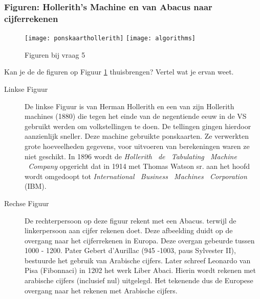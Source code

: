 \documentclass[../main.tex]{subfiles}
\begin{document}
\subsubsection{Figuren: Hollerith's Machine en van Abacus naar cijferrekenen}

\begin{figure}[ht!]
	\begin{center}
		\texttt{[image: ponskaarthollerith]}
		\texttt{[image: algorithms]}
	\end{center}
	\caption{Figuren bij vraag 5}
	\label{fig:vraag5}
\end{figure}

\begin{question}
Kan je de de figuren op Figuur \ref{fig:vraag5} thuisbrengen? Vertel wat je ervan weet.
\end{question}
\begin{description}
	\item[Linkse Figuur] De linkse Figuur is van Herman Hollerith en een van zijn Hollerith machines (1880) die tegen het einde van de negentiende eeuw in de VS gebruikt werden om volkstellingen te doen. De tellingen gingen hierdoor aanzienlijk sneller.
	Deze machine gebruikte ponskaarten. Ze verwerkten grote hoeveelheden gegevens, voor uitvoeren van berekeningen waren ze niet geschikt.
	In 1896 wordt de \emph{Hollerith  de  Tabulating  Machine  Company} opgericht dat in 1914 met Thomas Watson sr. aan het hoofd wordt omgedoopt tot \emph{International  Business  Machines  Corporation} (IBM).
	\item[Rechse Figuur] De rechterpersoon op deze figuur rekent met een Abacus. terwijl de linkerpersoon aan cijfer rekenen doet. Deze afbeelding duidt op de overgang naar het cijferrekenen in Europa. Deze overgan gebeurde tussen 1000 - 1200. Pater Gebert d'Aurillac (945 -1003, paus Sylvester II), bestuurde het gebruik van Arabische cijfers. Later schreef Leonardo van Pisa (Fibonnaci) in 1202 het werk Liber Abaci. Hierin wordt rekenen met arabische cijfers (inclusief nul) uitgelegd. Het tekenende dus de Europese overgang naar het rekenen met Arabische cijfers.
\end{description}
\end{document}
